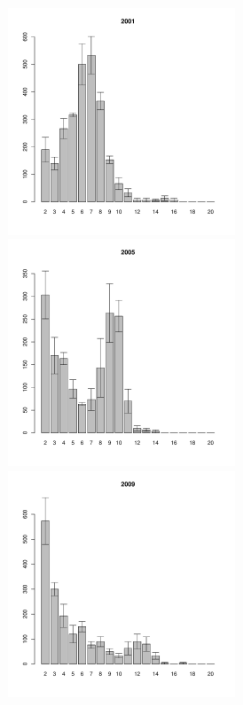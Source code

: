 	\begin{figure}[hp]

	\begin{minipage}[b]{.3\linewidth}
	\begin{center}
	\includegraphics[width=60mm]{../White_Sea/Estuatiy_Luvenga/sizestr2_2001_.pdf}
	\end{center}
	\end{minipage}
	\hfill
	\begin{minipage}[b]{.3\linewidth}
	\begin{center}
	\includegraphics[width=60mm]{../White_Sea/Estuatiy_Luvenga/sizestr2_2005_.pdf}
	\end{center}
	\end{minipage}
	\hfill
	\begin{minipage}[b]{.3\linewidth}
	\begin{center}
	\includegraphics[width=60mm]{../White_Sea/Estuatiy_Luvenga/sizestr2_2009_.pdf}

\end{center}
\end{minipage}
\end{figure}
